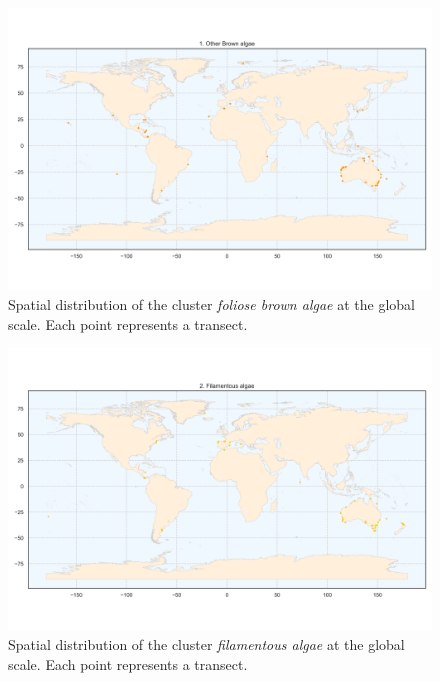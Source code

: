 \begin{figure}
\hypertarget{fig:chap2figS3}{%
\centering
\includegraphics{03-Chapitre2/figures/supplementary/06-spatial-cluster_distribution_cluster_0.png}
\caption{Spatial distribution of the cluster \emph{foliose brown algae}
at the global scale. Each point represents a
transect.}\label{fig:chap2figS3}
}
\end{figure}

\begin{figure}
\hypertarget{fig:chap2figS4}{%
\centering
\includegraphics{03-Chapitre2/figures/supplementary/06-spatial-cluster_distribution_cluster_1.png}
\caption{Spatial distribution of the cluster \emph{filamentous algae} at
the global scale. Each point represents a
transect.}\label{fig:chap2figS4}
}
\end{figure}

